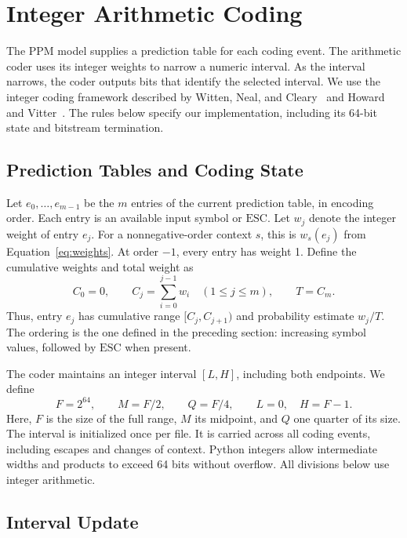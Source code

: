\documentclass[12pt,onecolumn]{article}
\newcommand{\ESC}{\mathrm{ESC}}
\begin{document}
\section{Integer Arithmetic Coding}
\label{sec:arithmetic}

The PPM model supplies a prediction table for each coding event.
The arithmetic coder uses its integer weights to narrow a numeric interval.
As the interval narrows, the coder outputs bits that identify the selected
interval. We use the integer coding framework described by Witten, Neal, and
Cleary~\cite{witten1987} and Howard and Vitter~\cite{howard1992}.
The rules below specify our implementation, including its 64-bit state and
bitstream termination.

\subsection{Prediction Tables and Coding State}

Let $e_0,\ldots,e_{m-1}$ be the $m$ entries of the current prediction table,
in encoding order. Each entry is an available input symbol or $\ESC$.
Let $w_j$ denote the integer weight of entry $e_j$.
For a nonnegative-order context $s$, this is $w_s(e_j)$ from
Equation~\eqref{eq:weights}. At order $-1$, every entry has weight 1.
Define the cumulative weights and total weight as
\begin{equation}
  C_0=0,\qquad C_j=\sum_{i=0}^{j-1}w_i\quad(1\leq j\leq m),
  \qquad T=C_m.
  \label{eq:cumulative}
\end{equation}
Thus, entry $e_j$ has cumulative range $[C_j,C_{j+1})$ and probability
estimate $w_j/T$. The ordering is the one defined in the preceding section:
increasing symbol values, followed by $\ESC$ when present.

The coder maintains an integer interval $[L,H]$, including both endpoints.
We define
\begin{equation}
  F=2^{64},\qquad M=F/2,\qquad Q=F/4,
  \qquad L=0,\quad H=F-1.
\end{equation}
Here, $F$ is the size of the full range, $M$ its midpoint, and $Q$ one quarter
of its size. The interval is initialized once per file. It is carried across
all coding events, including escapes and changes of context.
Python integers allow intermediate widths and products to exceed 64 bits
without overflow. All divisions below use integer arithmetic.

\subsection{Interval Update}
\end{document}
